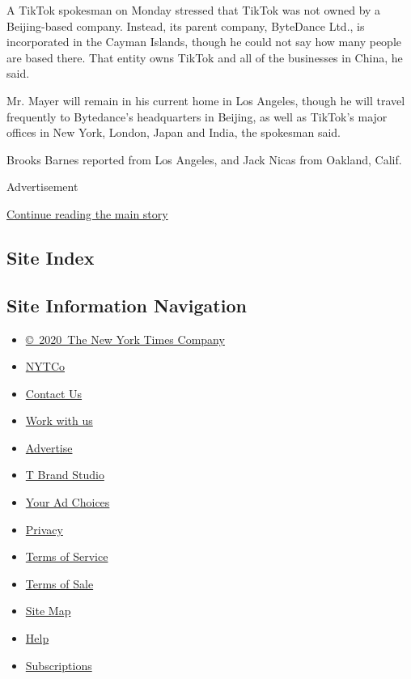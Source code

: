 A TikTok spokesman on Monday stressed that TikTok was not owned by a
Beijing-based company. Instead, its parent company, ByteDance Ltd., is
incorporated in the Cayman Islands, though he could not say how many
people are based there. That entity owns TikTok and all of the
businesses in China, he said.

Mr. Mayer will remain in his current home in Los Angeles, though he will
travel frequently to Bytedance's headquarters in Beijing, as well as
TikTok's major offices in New York, London, Japan and India, the
spokesman said.

Brooks Barnes reported from Los Angeles, and Jack Nicas from Oakland,
Calif.

Advertisement

\protect\hyperlink{after-bottom}{Continue reading the main story}

\hypertarget{site-index}{%
\subsection{Site Index}\label{site-index}}

\hypertarget{site-information-navigation}{%
\subsection{Site Information
Navigation}\label{site-information-navigation}}

\begin{itemize}
\tightlist
\item
  \href{https://help.nytimes.com/hc/en-us/articles/115014792127-Copyright-notice}{©~2020~The
  New York Times Company}
\end{itemize}

\begin{itemize}
\tightlist
\item
  \href{https://www.nytco.com/}{NYTCo}
\item
  \href{https://help.nytimes.com/hc/en-us/articles/115015385887-Contact-Us}{Contact
  Us}
\item
  \href{https://www.nytco.com/careers/}{Work with us}
\item
  \href{https://nytmediakit.com/}{Advertise}
\item
  \href{http://www.tbrandstudio.com/}{T Brand Studio}
\item
  \href{https://www.nytimes.com/privacy/cookie-policy\#how-do-i-manage-trackers}{Your
  Ad Choices}
\item
  \href{https://www.nytimes.com/privacy}{Privacy}
\item
  \href{https://help.nytimes.com/hc/en-us/articles/115014893428-Terms-of-service}{Terms
  of Service}
\item
  \href{https://help.nytimes.com/hc/en-us/articles/115014893968-Terms-of-sale}{Terms
  of Sale}
\item
  \href{https://spiderbites.nytimes.com}{Site Map}
\item
  \href{https://help.nytimes.com/hc/en-us}{Help}
\item
  \href{https://www.nytimes.com/subscription?campaignId=37WXW}{Subscriptions}
\end{itemize}
